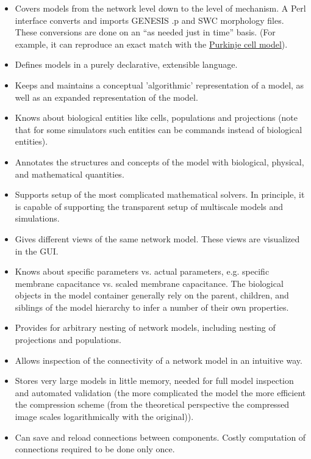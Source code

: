 \documentclass[12pt]{article}
\begin{document}
\begin{itemize}

\item Covers models from the network level down to the level of mechanism. A Perl interface converts and imports GENESIS .p and SWC morphology files. These conversions are done on an ``as needed just in time'' basis. (For example, it can reproduce an exact match with the \href{../document-purkinje-cell-model/document-purkinje-cell-model.pdf}{Purkinje cell model}).

\item Defines models in a purely declarative, extensible language.

\item Keeps and maintains a conceptual 'algorithmic' representation of a model, as well as an expanded representation of the model.

\item Knows about biological entities like cells, populations and projections (note that for some simulators such entities can be commands instead of biological entities).

\item Annotates the structures and concepts of the model with biological, physical, and mathematical quantities.

\item Supports setup of the most complicated mathematical solvers. In principle, it is capable of supporting the transparent setup of multiscale models and simulations.

\item Gives different views of the same network model. These views are visualized in the GUI.

\item Knows about specific parameters vs. actual parameters, e.g. specific membrane capacitance vs. scaled membrane capacitance. The biological objects in the model container generally rely on the parent, children, and siblings of the model hierarchy to infer a number of their own properties.

\item Provides for arbitrary nesting of network models, including nesting of projections and populations.

\item Allows inspection of the connectivity of a network model in an intuitive way.

\item Stores very large models in little memory, needed for full model inspection and automated validation (the more complicated the model the more efficient the compression scheme (from the theoretical perspective the compressed image scales logarithmically with the original)).

\item Can save and reload connections between components. Costly computation of connections required to be done only once.
    
\end{itemize}
    
\end{document}
